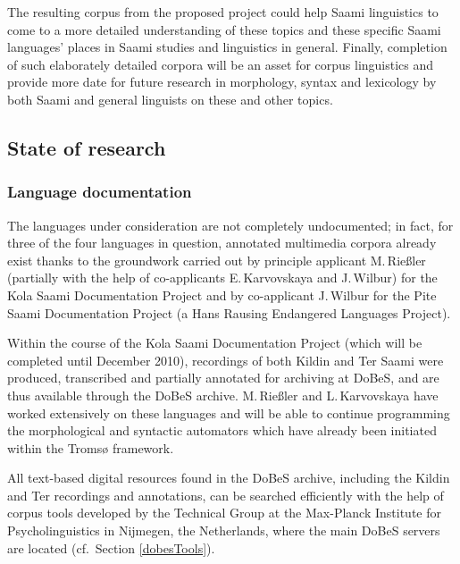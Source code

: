 \documentclass[a4paper,12pt]{article}
\begin{document}
The resulting corpus from the proposed project could help Saami linguistics to come to a more detailed understanding of these topics and these specific Saami languages' places in Saami studies and linguistics in general. Finally, completion of such elaborately detailed corpora will be an asset for corpus linguistics and provide more date for future research in morphology, syntax and lexicology by both Saami and general linguists on these and other topics.

\subsection{State of research}
\subsubsection{Language documentation}%

The languages under consideration are not completely undocumented; in fact, for three of the four languages in question, annotated multimedia corpora already exist thanks to the groundwork carried out by principle applicant M.\,Rießler (partially with the help of co-applicants E.\,Karvovskaya and J.\,Wilbur) for the Kola Saami Documentation Project \cite[a DoBeS project, cf.][]{KSDP} and by co-applicant J.\,Wilbur for the Pite Saami Documentation Project (a Hans Rausing Endangered Languages Project). %

Within the course of the Kola Saami Documentation Project (which will be completed until December 2010), recordings of both Kildin and Ter Saami were produced, transcribed and partially annotated for archiving at DoBeS, and are thus available through the DoBeS archive. M.\,Rießler and L.\,Karvovskaya have worked extensively on these languages and will be able to continue programming the morphological and syntactic automators which have already been initiated within the Tromsø framework. 

All text-based digital resources found in the DoBeS archive, including the Kildin and Ter recordings and annotations, can be searched efficiently with the help of corpus tools developed by the Technical Group at the Max-Planck Institute for Psycholinguistics in Nijmegen, the Netherlands, where the main DoBeS servers are located (cf.~Section \ref{dobesTools}).
\end{document}
